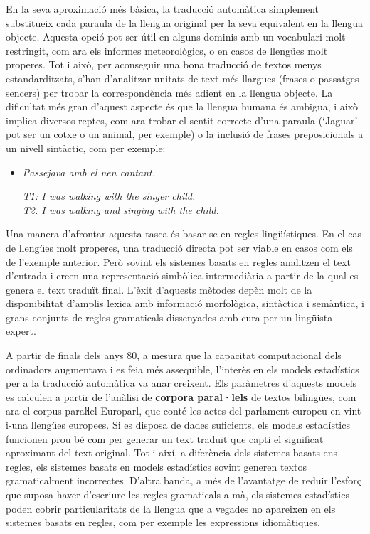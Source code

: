 \begin{multicols}{2}
En la seva aproximació més bàsica, la traducció automàtica simplement substitueix cada paraula de la llengua original per la seva equivalent en la llengua objecte. Aquesta opció pot ser útil en alguns dominis amb un vocabulari molt restringit, com ara els informes meteorològics, o en casos de llengües molt properes. Tot i això, per aconseguir una bona traducció de textos menys estandarditzats, s’han d’analitzar unitats de text més llargues (frases o passatges sencers) per trobar la correspondència més adient en la llengua objecte. La dificultat més gran d’aquest aspecte és que la llengua humana és ambigua, i això implica diversos reptes, com ara trobar el sentit correcte d’una paraula (‘Jaguar’ pot ser un cotxe o un animal, per exemple) o la inclusió de frases preposicionals a un nivell sintàctic, com per exemple:

\begin{itemize}
\item[] \textit{Passejava amb el nen cantant.}

\textit{T1: I was walking with the singer child.}\\
\textit{T2. I was walking and singing with the child.}
\end{itemize}

Una manera d’afrontar aquesta tasca és basar-se en regles lingüístiques. En el cas de llengües molt properes, una traducció directa pot ser viable en casos com els de l’exemple anterior. Però sovint els sistemes basats en regles analitzen el text d’entrada i creen una representació simbòlica intermediària a partir de la qual es genera el text traduït final. L’èxit d’aquests mètodes depèn molt de la disponibilitat d’amplis lexica amb informació morfològica, sintàctica i semàntica, i grans conjunts de regles gramaticals dissenyades amb cura per un lingüista expert.

A partir de finals dels anys 80, a mesura que la capacitat computacional dels ordinadors augmentava i es feia més assequible, l’interès en els models estadístics per a la traducció automàtica va anar creixent. Els paràmetres d’aquests models es calculen a partir de l’anàlisi de \textbf{corpora paral·lels} de textos bilingües, com ara el corpus paraŀlel Europarl, que conté les actes del parlament europeu en vint-i-una llengües europees. Si es disposa de dades suficients, els models estadístics funcionen prou bé com per generar un text traduït que capti el significat aproximant del text original. Tot i així, a diferència dels sistemes basats ens regles, els sistemes basats en models estadístics sovint generen textos gramaticalment incorrectes. D’altra banda, a més de l’avantatge de reduir l’esforç que suposa haver d’escriure les regles gramaticals a mà, els sistemes estadístics poden cobrir particularitats de la llengua que a vegades no apareixen en els sistemes basats en regles, com per exemple les expressions idiomàtiques. 


\end{multicols}

